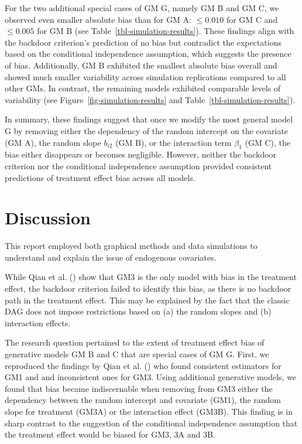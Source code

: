 \documentclass[
  11pt,
  a4paper,
]{article}
\begin{document}
For the two additional special cases of GM G, namely GM B and GM C, we
observed even smaller absolute bias than for GM A: \(\leq 0.010\) for GM
C and \(\leq 0.005\) for GM B (see Table~\ref{tbl-simulation-results}).
These findings align with the backdoor criterion's prediction of no bias
but contradict the expectations based on the conditional independence
assumption, which suggests the presence of bias. Additionally, GM B
exhibited the smallest absolute bias overall and showed much smaller
variability across simulation replications compared to all other GMs. In
contrast, the remaining models exhibited comparable levels of
variability (see Figure~\ref{fig-simulation-results} and
Table~\ref{tbl-simulation-results}).

In summary, these findings suggest that once we modify the most general
model G by removing either the dependency of the random intercept on the
covariate (GM A), the random slope \(b_{i2}\) (GM B), or the interaction
term \(\beta_1\) (GM C), the bias either disappears or becomes
negligible. However, neither the backdoor criterion nor the conditional
independence assumption provided consistent predictions of treatment
effect bias across all models.

\section{Discussion}\label{discussion}

This report employed both graphical methods and data simulations to
understand and explain the issue of endogenous covariates.

While Qian et al. () show that GM3 is the
only model with bias in the treatment effect, the backdoor criterion
failed to identify this bias, as there is no backdoor path in the
treatment effect. This may be explained by the fact that the classic DAG
does not impose restrictions based on (a) the random slopes and (b)
interaction effects.

The research question pertained to the extent of treatment effect bias
of generative models GM B and C that are special cases of GM G. First,
we reproduced the findings by Qian et al.
() who found consistent estimators for GM1
and and inconsistent ones for GM3. Using additional generative models,
we found that bias became indiscernable when removing from GM3 either
the dependency between the random intercept and covariate (GM1), the
random slope for treatment (GM3A) or the interaction effect (GM3B). This
finding is in sharp contrast to the suggestion of the conditional
independence assumption that the treatment effect would be biased for
GM3, 3A and 3B.
\end{document}
